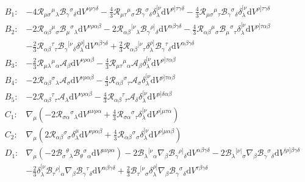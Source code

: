 \documentclass{article}
\providecommand{\Rie}[3]{\mathcal{R}_{#1}{}^{ #2}{}_{#3}}
\providecommand{\B}[3]{\mathcal{B}_{#1}{}^{ #2}{}_{#3}}
\providecommand{\A}[1]{\mathcal{A}_{#1}}
\providecommand{\deV}[1]{\mathrm{d}V^{#1}}
\begin{document}
\begin{align*}
    B_1: & -4\Rie{\mu\sigma}{\mu}{\lambda}\B{\gamma}{\sigma}{\delta}\deV{\nu\rho\gamma\delta} - \frac{4}{3}\Rie{\mu\tau}{\mu}{\sigma}\B{\gamma}{\sigma}{\delta}\delta^{[\nu}_{\lambda}\deV{\rho]\tau\gamma\delta} - \frac{4}{3}\Rie{\mu\sigma}{\mu}{\tau}\B{\gamma}{\sigma}{\delta}\delta^{[\nu}_{\lambda}\deV{\rho]\tau\gamma\delta}\\
    B_2: & -2\Rie{\alpha\beta}{\mu}{\sigma}\B{\mu}{\sigma}{\lambda}\deV{\nu\rho\alpha\beta} - 2\Rie{\alpha\beta}{[\nu}{\lambda}\B{\gamma}{\rho]}{\delta}\deV{\alpha\beta\gamma\delta} - \frac{4}{3}\Rie{\alpha\beta}{\mu}{\sigma}\B{\mu}{\sigma}{\tau}\delta^{[\nu}_\lambda\deV{\rho]\tau\alpha\beta}\\
        & -\frac{2}{3}\Rie{\alpha\beta}{\tau}{\tau}\B{\gamma}{[\nu}{\delta}\delta^{\rho]}_\lambda\deV{\alpha\beta\gamma\delta} + \frac{2}{3}\Rie{\alpha\beta}{[\nu}{\tau}\delta^{\rho]}_{\lambda}\B{\gamma}{\tau}{\delta}\deV{\alpha\beta\gamma\delta}\\
    B_3: & -\frac{2}{3}\Rie{\mu\lambda}{\mu}{\alpha}\A{\beta}\deV{\nu\rho\alpha\beta} - \frac{4}{3}\Rie{\mu\tau}{\mu}{\alpha}\A{\beta}\delta^{[\nu}_{\lambda}\deV{\rho]\tau\alpha\beta}\\
    B_4: & -2\Rie{\alpha\beta}{\sigma}{\lambda} \A{\sigma}\deV{\nu\rho\alpha\beta} - \frac{4}{3}\Rie{\alpha\beta}{\sigma}{\tau}\A{\sigma}\delta^{[\nu}_{\lambda}\deV{\rho]\tau\alpha\beta}\\
    B_5: & -2\Rie{\alpha\beta}{\tau}{\tau} \A{\lambda}\deV{\nu\rho\alpha\beta} - \frac{4}{3}\Rie{\alpha\beta}{\tau}{\tau}\A{\delta}\delta^{[\nu}_{\lambda}\deV{\rho]\delta\alpha\beta}\\
    C_1: & \nabla_\mu \left(-2 \Rie{\sigma\alpha}{\sigma}{\lambda} \deV{\mu\nu\rho\alpha} + \frac{4}{3}\Rie{\sigma\alpha}{\sigma}{\tau}\delta^{[\nu}_{\lambda}\deV{\rho]\mu\tau\alpha}\right) \\
    C_2: & \nabla_\mu \left(2\Rie{\alpha\beta}{\sigma}{\sigma}\delta^{\mu}_{\lambda}\deV{\nu\rho\alpha\beta} + \frac{4}{3}\Rie{\alpha\beta}{\sigma}{\sigma}\delta^{[\nu}_{\lambda}\deV{\rho]\mu\alpha\beta}\right) \\
    D_1: & \nabla_{\mu}\left( -2 \B{\sigma}{\theta}{\lambda} \B{\theta}{\sigma}{\alpha}\deV{\mu\nu\rho\alpha} \right) - 2\B{\lambda}{[\nu}{\alpha} \nabla_{\beta} \B{\gamma}{\rho]}{\delta} \deV{\alpha\beta\gamma\delta} - 2 \B{\lambda}{[\nu\lvert}{\sigma} \nabla_{\beta} \B{\gamma}{\sigma}{\delta} \deV{\lvert\rho]\beta\gamma\delta} \\
        & -\frac{2}{3} \delta^{[\nu}_{\lambda} \B{\tau}{\rho]}{\alpha} \nabla_{\beta} \B{\gamma}{\tau}{\delta} \deV{\alpha\beta\gamma\delta} + \frac{2}{3}\B{\tau}{[\nu}{\sigma}\delta^{\rho]}_{\lambda} \nabla_{\beta} \B{\gamma}{\sigma}{\delta} \deV{\tau\beta\gamma\delta}\\

\end{align*}
\end{document}
